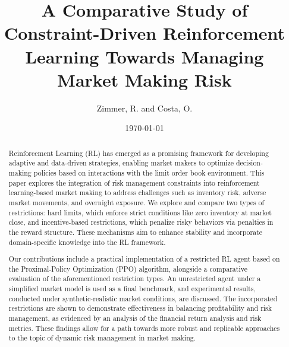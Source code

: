 \title{A Comparative Study of Constraint-Driven Reinforcement Learning Towards Managing Market Making Risk}
\author{Zimmer, R. and Costa, O.}
\date{\today}

\maketitle

\begin{abstract}
    Reinforcement Learning (RL) has emerged as a promising framework for developing adaptive and data-driven strategies,
    enabling market makers to optimize decision-making policies based on interactions with the limit order book environment.
    This paper explores the integration of risk management constraints into reinforcement learning-based market making to address challenges
    such as inventory risk, adverse market movements, and overnight exposure.
    We explore and compare two types of restrictions: 
    hard limits, which enforce strict conditions like zero inventory at market close,
    and incentive-based restrictions, which penalize risky behaviors via penalties in the reward structure.
    These mechanisms aim to enhance stability and incorporate domain-specific knowledge into the RL framework.

    Our contributions include a practical implementation of a restricted RL agent based on the Proximal-Policy Optimization (PPO) algorithm,
    alongside a comparative evaluation of the aforementioned restriction types.
    An unrestricted agent under a simplified market model is used as a final benchmark,
    and experimental results, conducted under synthetic-realistic market conditions, are discussed.
    The incorporated restrictions are shown to demonstrate effectiveness in balancing profitability and risk management,
    as evidenced by an analysis of the financial return analysis and risk metrics.
    These findings allow for a path towards more robust and replicable approaches to the topic of dynamic risk management in market making.
\end{abstract}
